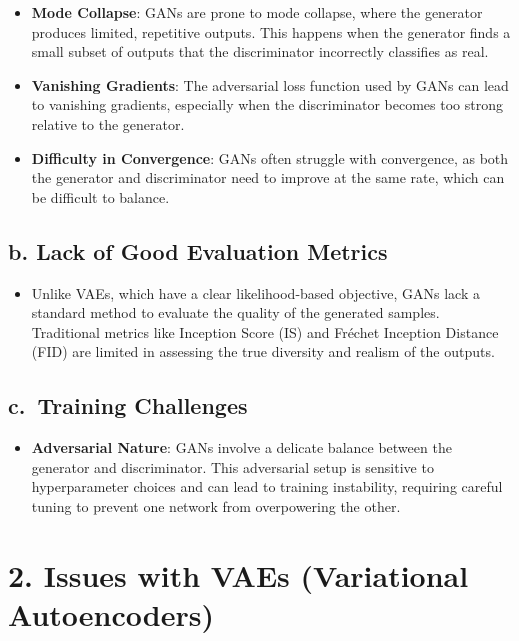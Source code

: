 \documentclass[
]{book}
\providecommand{\tightlist}{%
  \setlength{\itemsep}{0pt}\setlength{\parskip}{0pt}}
\begin{document}
\begin{itemize}
\tightlist
\item
  \textbf{Mode Collapse}: GANs are prone to mode collapse, where the generator produces limited, repetitive outputs. This happens when the generator finds a small subset of outputs that the discriminator incorrectly classifies as real.
\item
  \textbf{Vanishing Gradients}: The adversarial loss function used by GANs can lead to vanishing gradients, especially when the discriminator becomes too strong relative to the generator.
\item
  \textbf{Difficulty in Convergence}: GANs often struggle with convergence, as both the generator and discriminator need to improve at the same rate, which can be difficult to balance.
\end{itemize}

\subsection{b. Lack of Good Evaluation Metrics}\label{b.-lack-of-good-evaluation-metrics}

\begin{itemize}
\tightlist
\item
  Unlike VAEs, which have a clear likelihood-based objective, GANs lack a standard method to evaluate the quality of the generated samples. Traditional metrics like Inception Score (IS) and Fréchet Inception Distance (FID) are limited in assessing the true diversity and realism of the outputs.
\end{itemize}

\subsection{c.~Training Challenges}\label{c.-training-challenges}

\begin{itemize}
\tightlist
\item
  \textbf{Adversarial Nature}: GANs involve a delicate balance between the generator and discriminator. This adversarial setup is sensitive to hyperparameter choices and can lead to training instability, requiring careful tuning to prevent one network from overpowering the other.
\end{itemize}

\section{2. Issues with VAEs (Variational Autoencoders)}\label{issues-with-vaes-variational-autoencoders}
\end{document}
